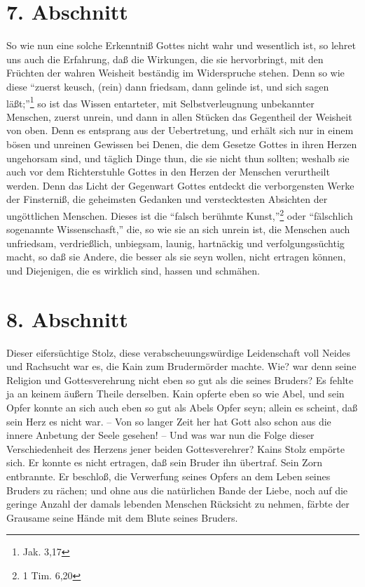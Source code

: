 \section{7. Abschnitt} \label{kap7_ab7}

So wie nun eine solche Erkenntniß Gottes nicht wahr und wesentlich ist, so
lehret uns auch die Erfahrung, daß die Wirkungen, die sie hervorbringt, mit den
Früchten der wahren Weisheit beständig im Widerspruche stehen. Denn so wie diese
"`zuerst keusch, (rein) dann friedsam, dann gelinde ist, und sich sagen
läßt;"'\footnote{Jak. 3,17} so ist das Wissen entarteter, mit Selbstverleugnung
unbekannter Menschen, zuerst unrein, und dann in allen Stücken das Gegentheil
der Weisheit von oben. Denn es entsprang aus der Uebertretung, und erhält sich
nur in einem bösen und unreinen Gewissen bei Denen, die dem Gesetze Gottes in
ihren Herzen ungehorsam sind, und täglich Dinge thun, die sie nicht thun
sollten; weshalb sie auch vor dem Richterstuhle Gottes in den Herzen der
Menschen verurtheilt werden. Denn das Licht der Gegenwart Gottes entdeckt die
verborgensten Werke der Finsterniß, die geheimsten Gedanken und verstecktesten
Absichten der ungöttlichen Menschen. Dieses ist die "`falsch berühmte
Kunst,"'\footnote{1 Tim. 6,20} oder  "`fälschlich sogenannte Wissenschasft,"'
die, so wie sie an sich unrein ist, die Menschen auch unfriedsam, verdrießlich,
unbiegsam, launig, hartnäckig und verfolgungssüchtig macht, so daß sie Andere,
die besser als sie seyn wollen, nicht ertragen können, und Diejenigen, die es
wirklich sind, hassen und schmähen.

\section{8. Abschnitt} \label{kap7_ab8}

Dieser eifersüchtige Stolz, diese verabscheuungswürdige Leidenschaft voll Neides
und Rachsucht war es, die Kain zum Brudermörder machte. Wie? war denn seine
Religion und Gottesverehrung nicht eben so gut als die seines Bruders? Es fehlte
ja an keinem äußern Theile derselben. Kain opferte eben so wie Abel, und sein
Opfer konnte an sich auch eben so gut als  Abels Opfer seyn; allein es scheint,
daß sein Herz es nicht war. -- Von so langer Zeit her hat Gott also schon aus
die innere Anbetung der Seele gesehen! -- Und was war nun die Folge dieser
Verschiedenheit des Herzens jener beiden Gottesverehrer? Kains Stolz empörte
sich. Er konnte es nicht ertragen, daß sein Bruder ihn übertraf. Sein Zorn
entbrannte. Er beschloß, die Verwerfung seines Opfers an dem Leben seines
Bruders zu rächen; und ohne aus die natürlichen Bande der Liebe, noch auf die
geringe Anzahl der damals lebenden Menschen Rücksicht zu nehmen, färbte der
Grausame seine Hände mit dem Blute seines Bruders.

